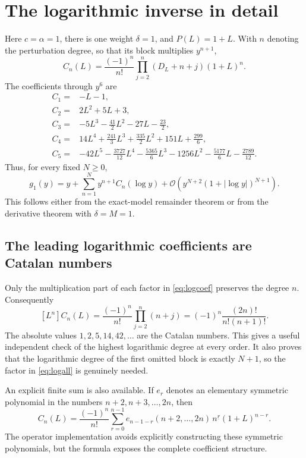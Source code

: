 \documentclass[11pt,a4paper]{article}
\numberwithin{equation}{section}
\theoremstyle{definition}\newtheorem{definition}[theorem]{Definition}
\theoremstyle{remark}\newtheorem{remark}[theorem]{Remark}
\newcommand{\OO}{\mathcal O}\newcommand{\Id}{\mathrm{id}}
\begin{document}
\section{The logarithmic inverse in detail}
\label{sec:logexample}
Here $c=\alpha=1$, there is one weight $\delta=1$, and $P(L)=1+L$. With $n$ denoting the perturbation degree, so that its block multiplies $y^{n+1}$,
\begin{equation}\label{eq:logcoef}
C_n(L)=\frac{(-1)^n}{n!}
\prod_{j=2}^{n}(D_L+n+j)(1+L)^n.
\end{equation}
The coefficients through $y^6$ are
\begin{align*}
C_1={}&-L-1,\\
C_2={}&2L^2+5L+3,\\
C_3={}&-5L^3-\frac{41}{2}L^2-27L-\frac{23}{2},\\
C_4={}&14L^4+\frac{241}{3}L^3+\frac{335}{2}L^2+151L+\frac{299}{6},\\
C_5={}&-42L^5-\frac{3727}{12}L^4-\frac{5365}{6}L^3
        -1256L^2-\frac{5177}{6}L-\frac{2789}{12}.
\end{align*}
Thus, for every fixed $N\ge0$,
\begin{equation}\label{eq:logall}
g_1(y)=y+\sum_{n=1}^{N}y^{n+1}C_n(\log y)
+\OO\!\left(y^{N+2}(1+|\log y|)^{N+1}\right).
\end{equation}
This follows either from the exact-model remainder theorem or from the derivative theorem with $\delta=M=1$.

\subsection{The leading logarithmic coefficients are Catalan numbers}
Only the multiplication part of each factor in \eqref{eq:logcoef} preserves the degree $n$. Consequently
\begin{equation}\label{eq:catalanlog}
[L^n]C_n(L)=\frac{(-1)^n}{n!}\prod_{j=2}^{n}(n+j)
=(-1)^n\frac{(2n)!}{n!(n+1)!}.
\end{equation}
The absolute values $1,2,5,14,42,\ldots$ are the Catalan numbers. This gives a useful independent check of the highest logarithmic degree at every order. It also proves that the logarithmic degree of the first omitted block is exactly $N+1$, so the factor in \eqref{eq:logall} is genuinely needed.

An explicit finite sum is also available. If $e_r$ denotes an elementary symmetric polynomial in the numbers $n+2,n+3,\ldots,2n$, then
\begin{equation}
C_n(L)=\frac{(-1)^n}{n!}\sum_{r=0}^{n-1}
 e_{n-1-r}(n+2,\ldots,2n)\,
 n^{\underline r}(1+L)^{n-r}.
\end{equation}
The operator implementation avoids explicitly constructing these symmetric polynomials, but the formula exposes the complete coefficient structure.
\end{document}
